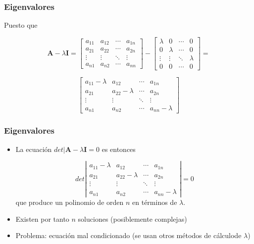 \documentclass{beamer}
\begin{document}
\begin{frame}
\frametitle{Eigenvalores}
Puesto que 
  
\begin{equation*}
\boldsymbol{A}- \lambda \boldsymbol{I} = \begin{bmatrix} a_{11} & a_{12}  & \cdots & a_{1n}  \\   a_{21} & a_{22 } & \cdots & a_{2n}   \\ \vdots & \vdots   & \ddots & \vdots  \\   a_{n1} & a_{n2}  & \cdots & a_{nn}  \end{bmatrix}- \begin{bmatrix} \lambda & 0  & \cdots & 0  \\   0 & \lambda  & \cdots & 0   \\ \vdots & \vdots   & \ddots & \lambda \\   0 & 0  & \cdots & 0  \end{bmatrix}= 
\end{equation*}

\begin{equation*}
\begin{bmatrix} a_{11}-\lambda & a_{12}  & \cdots & a_{1n}  \\   a_{21} & a_{22}-\lambda  & \cdots & a_{2n }  \\ \vdots & \vdots   & \ddots & \vdots  \\   a_{n1} & a_{n2}  & \cdots & a_{nn} -\lambda  \end{bmatrix}
\end{equation*}




\end{frame}
\begin{frame}
\frametitle{Eigenvalores}
\begin{itemize}
\item La ecuación $det\vert \boldsymbol{A}- \lambda \boldsymbol{I}=0$ es entonces

  

\begin{equation*}
det \left|
\begin{array}{cccc} a_{11}-\lambda & a_{12}  & \cdots & a_{1n}  \\   a_{21} & a_{22}-\lambda  & \cdots & a_{2n }  \\ \vdots & \vdots   & \ddots & \vdots  \\   a_{n1} & a_{n2}  & \cdots & a_{nn} -\lambda  
\end{array} \right|=0
\end{equation*}
que produce un polinomio de orden $n$ en términos de $\lambda$.
\item Existen por tanto $n$ soluciones (posiblemente complejas)
\item Problema: ecuación mal condicionado (se usan otros métodos de cálculode $\lambda$)
\end{itemize}


\end{frame}
\end{document}
